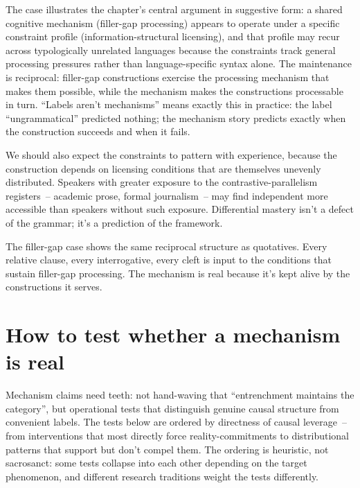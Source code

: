The  case illustrates the chapter's central argument in suggestive form: a shared cognitive mechanism (filler-gap processing) appears to operate under a specific constraint profile (information-structural licensing), and that profile may recur across typologically unrelated languages because the constraints track general processing pressures rather than language-specific syntax alone. The maintenance is reciprocal: filler-gap constructions exercise the processing mechanism that makes them possible, while the mechanism makes the constructions processable in turn. \enquote{Labels aren't mechanisms} means exactly this in practice: the label \enquote{ungrammatical} predicted nothing; the mechanism story predicts exactly when the construction succeeds and when it fails.

We should also expect the constraints to pattern with experience, because the construction depends on licensing conditions that are themselves unevenly distributed. Speakers with greater exposure to the contrastive-parallelism registers~-- academic prose, formal journalism~-- may find independent  more accessible than speakers without such exposure. Differential mastery isn't a defect of the grammar; it's a prediction of the framework.

The filler-gap case shows the same reciprocal structure as quotatives. Every relative clause, every interrogative, every cleft is input to the conditions that sustain filler-gap processing. The mechanism is real because it's kept alive by the constructions it serves.


\section{How to test whether a mechanism is real}
\label{sec:6:robustness-tests}

Mechanism claims need teeth: not hand-waving that \enquote{entrenchment maintains the category}, but operational tests that distinguish genuine causal structure from convenient labels. The tests below are ordered by directness of causal leverage~-- from interventions that most directly force reality-commitments to distributional patterns that support but don't compel them. The ordering is heuristic, not sacrosanct: some tests collapse into each other depending on the target phenomenon, and different research traditions weight the tests differently.

